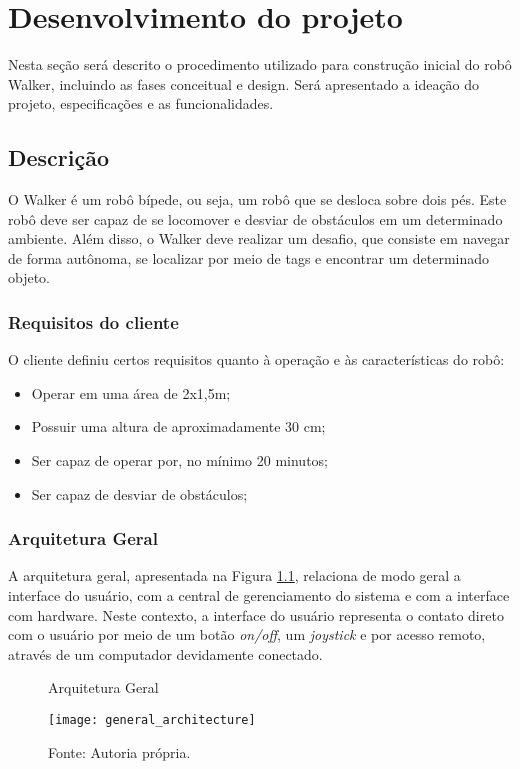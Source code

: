 \chapter{Desenvolvimento do projeto}
\label{chap:fundteor}
 Nesta seção será descrito o procedimento utilizado para construção inicial do robô Walker, incluindo as fases conceitual e design.  Será apresentado a ideação do projeto, especificações e as funcionalidades.

\section{Descrição}
 O Walker é um robô bípede, ou seja, um robô que se desloca sobre dois pés. Este robô deve ser capaz de se locomover e desviar de obstáculos em um determinado ambiente. Além disso, o Walker deve realizar um desafio, que consiste em navegar de forma autônoma, se localizar por meio de tags e encontrar um determinado objeto.

\subsection{Requisitos do cliente}
 O cliente definiu certos requisitos quanto à operação e  às características do robô:
 \begin{itemize}
    \item Operar em uma área de 2x1,5m;
    \item Possuir uma altura de aproximadamente 30 cm;
    \item Ser capaz de operar por, no mínimo 20 minutos;
    \item Ser capaz de desviar de obstáculos;
 \end{itemize}
\subsection{Arquitetura Geral}
 A arquitetura geral, apresentada na Figura \ref{fig:Arquitetura geral}, relaciona de modo geral a interface do usuário, com a central de gerenciamento do sistema e com a interface com hardware. Neste contexto, a interface do usuário representa o contato direto com o usuário por meio de um botão \textit{on/off}, um \textit{joystick} e por acesso remoto, através de um computador devidamente conectado.

 \begin{figure} [h!]	
    \centering

    \caption{Arquitetura Geral}
    \texttt{[image: general\_architecture]}
    \caption*{Fonte: Autoria própria.}
    \label{fig:Arquitetura geral}
\end{figure}	

